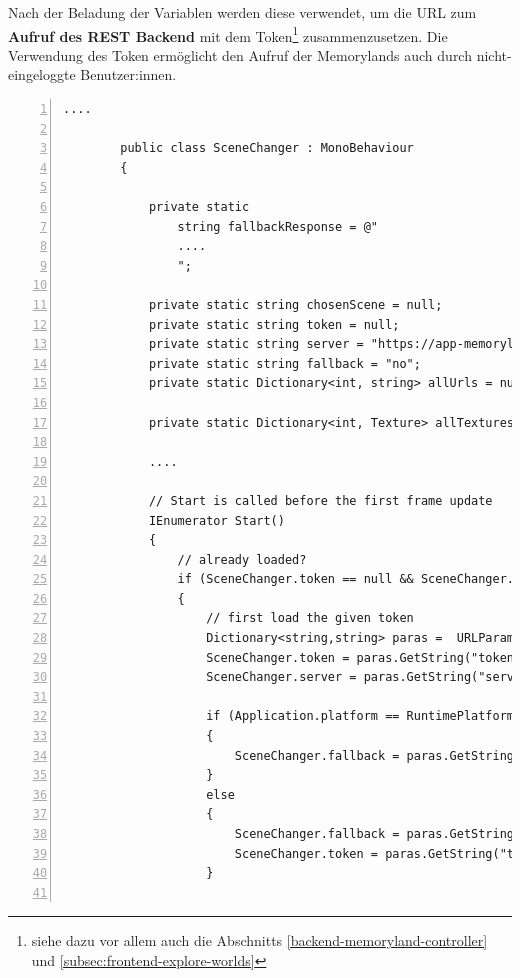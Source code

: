 Nach der Beladung der Variablen werden diese verwendet, um die URL zum \textbf{Aufruf des REST Backend} mit dem Token\footnote{siehe dazu vor allem auch die Abschnitts \ref{backend-memoryland-controller} und \ref{subsec:frontend-explore-worlds}} zusammenzusetzen. Die Verwendung des Token ermöglicht den Aufruf der Memorylands auch durch nicht-eingeloggte Benutzer:innen.



\begin{lstlisting}[numbers=left,caption={SceneChanger - Start},label={lst:unity-scene-changer-start}]
        ....
        
        public class SceneChanger : MonoBehaviour
        {
        
            private static 
                string fallbackResponse = @"
                ....
                ";
        
            private static string chosenScene = null;
            private static string token = null;
            private static string server = "https://app-memoryland.azurewebsites.net";
            private static string fallback = "no";
            private static Dictionary<int, string> allUrls = null;
        
            private static Dictionary<int, Texture> allTextures = new Dictionary<int, Texture> ();
        
            ....                
        
            // Start is called before the first frame update
            IEnumerator Start()
            {
                // already loaded?
                if (SceneChanger.token == null && SceneChanger.chosenScene == null) 
                {
                    // first load the given token
                    Dictionary<string,string> paras =  URLParameters.GetSearchParameters();
                    SceneChanger.token = paras.GetString("token", "");
                    SceneChanger.server = paras.GetString("server", "https://app-memoryland.azurewebsites.net");
                    
                    if (Application.platform == RuntimePlatform.WebGLPlayer)
                    {
                        SceneChanger.fallback = paras.GetString("fallback", "no");
                    }
                    else
                    {
                        SceneChanger.fallback = paras.GetString("fallback", "no");
                        SceneChanger.token = paras.GetString("token", "1920cf9e-b295-4c80-b347-75eff21a71f6");
                    }
                    

\end{lstlisting}
